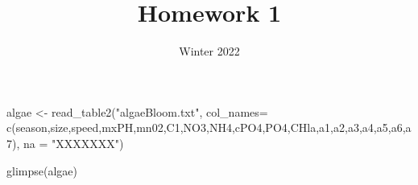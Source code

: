 \documentclass[
]{article}
\title{Homework 1}
\author{}
\date{\vspace{-2.5em}Winter 2022}
\newenvironment{Shaded}{\begin{snugshade}}{\end{snugshade}}
\newcommand{\AttributeTok}[1]{\textcolor[rgb]{0.77,0.63,0.00}{#1}}
\newcommand{\FunctionTok}[1]{\textcolor[rgb]{0.00,0.00,0.00}{#1}}
\newcommand{\NormalTok}[1]{#1}
\newcommand{\OtherTok}[1]{\textcolor[rgb]{0.56,0.35,0.01}{#1}}
\newcommand{\StringTok}[1]{\textcolor[rgb]{0.31,0.60,0.02}{#1}}
\begin{document}
\maketitle

\begin{Shaded}
\begin{Highlighting}[]
\NormalTok{algae }\OtherTok{\textless{}{-}} \FunctionTok{read\_table2}\NormalTok{(}\StringTok{"algaeBloom.txt"}\NormalTok{, }\AttributeTok{col\_names=}
                       \FunctionTok{c}\NormalTok{(}\StringTok{\textquotesingle{}season\textquotesingle{}}\NormalTok{,}\StringTok{\textquotesingle{}size\textquotesingle{}}\NormalTok{,}\StringTok{\textquotesingle{}speed\textquotesingle{}}\NormalTok{,}\StringTok{\textquotesingle{}mxPH\textquotesingle{}}\NormalTok{,}\StringTok{\textquotesingle{}mn02\textquotesingle{}}\NormalTok{,}\StringTok{\textquotesingle{}C1\textquotesingle{}}\NormalTok{,}\StringTok{\textquotesingle{}NO3\textquotesingle{}}\NormalTok{,}\StringTok{\textquotesingle{}NH4\textquotesingle{}}\NormalTok{,}\StringTok{\textquotesingle{}cPO4\textquotesingle{}}\NormalTok{,}\StringTok{\textquotesingle{}PO4\textquotesingle{}}\NormalTok{,}\StringTok{\textquotesingle{}CHla\textquotesingle{}}\NormalTok{,}\StringTok{\textquotesingle{}a1\textquotesingle{}}\NormalTok{,}\StringTok{\textquotesingle{}a2\textquotesingle{}}\NormalTok{,}\StringTok{\textquotesingle{}a3\textquotesingle{}}\NormalTok{,}\StringTok{\textquotesingle{}a4\textquotesingle{}}\NormalTok{,}\StringTok{\textquotesingle{}a5\textquotesingle{}}\NormalTok{,}\StringTok{\textquotesingle{}a6\textquotesingle{}}\NormalTok{,}\StringTok{\textquotesingle{}a7\textquotesingle{}}\NormalTok{), }\AttributeTok{na =} \StringTok{"XXXXXXX"}\NormalTok{)}

\FunctionTok{glimpse}\NormalTok{(algae)}
\end{Highlighting}
\end{Shaded}
\end{document}
